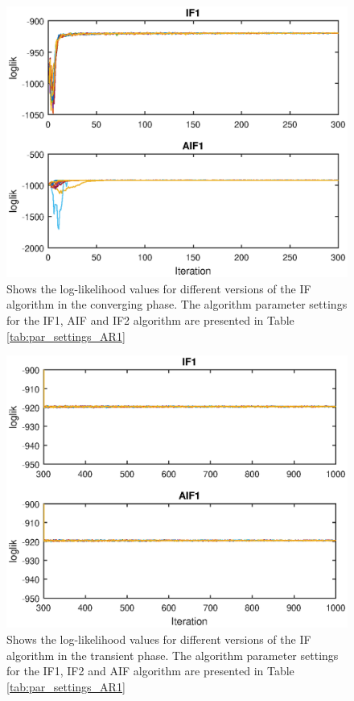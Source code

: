 \documentclass[twoside,openright]{report}
\begin{document}
\begin{figure}[h]
  \centering
    \includegraphics[width=1\textwidth]{./fig_simple_AR1/loglik_conv}
  \caption{Shows the log-likelihood values for different versions of the IF algorithm in the converging phase. The algorithm parameter settings for the IF1, AIF and IF2 algorithm are presented in Table \ref{tab:par_settings_AR1} }
  \label{fig:loglik_conv}
\end{figure}

\begin{figure}[h]
  \centering
    \includegraphics[width=1\textwidth]{./fig_simple_AR1/loglik_trans}
  \caption{Shows the log-likelihood values for different versions of the IF algorithm in the transient phase. The algorithm parameter settings for the IF1, IF2 and AIF algorithm are presented in Table \ref{tab:par_settings_AR1}}
  \label{fig:loglik_trans}
\end{figure}
\end{document}
